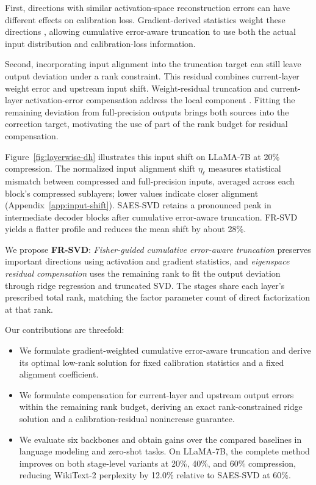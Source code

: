 \documentclass[11pt]{article}
\begin{document}
First, directions with similar activation-space reconstruction errors can have different effects on calibration loss. Gradient-derived statistics weight these directions \citep{hsu2022fwsvd,chekalina2025gfwsvd}, allowing cumulative error-aware truncation to use both the actual input distribution and calibration-loss information.

Second, incorporating input alignment into the truncation target can still leave output deviation under a rank constraint. This residual combines current-layer weight error and upstream input shift. Weight-residual truncation and current-layer activation-error compensation address the local component \citep{bai2025ercsvd,liu2025eora}. Fitting the remaining deviation from full-precision outputs brings both sources into the correction target, motivating the use of part of the rank budget for residual compensation.

Figure~\ref{fig:layerwise-dh} illustrates this input shift on LLaMA-7B at 20\% compression. The normalized input alignment shift $\eta_\ell$ measures statistical mismatch between compressed and full-precision inputs, averaged across each block's compressed sublayers; lower values indicate closer alignment (Appendix~\ref{app:input-shift}). SAES-SVD retains a pronounced peak in intermediate decoder blocks after cumulative error-aware truncation. FR-SVD yields a flatter profile and reduces the mean shift by about 28\%.



We propose \textbf{FR-SVD}: \emph{Fisher-guided cumulative error-aware truncation} preserves important directions using activation and gradient statistics, and \emph{eigenspace residual compensation} uses the remaining rank to fit the output deviation through ridge regression and truncated SVD. The stages share each layer's prescribed total rank, matching the factor parameter count of direct factorization at that rank.

Our contributions are threefold:
\begin{itemize}
\item We formulate gradient-weighted cumulative error-aware truncation and derive its optimal low-rank solution for fixed calibration statistics and a fixed alignment coefficient.
\item We formulate compensation for current-layer and upstream output errors within the remaining rank budget, deriving an exact rank-constrained ridge solution and a calibration-residual nonincrease guarantee.
\item We evaluate six backbones and obtain gains over the compared baselines in language modeling and zero-shot tasks. On LLaMA-7B, the complete method improves on both stage-level variants at 20\%, 40\%, and 60\% compression, reducing WikiText-2 perplexity by 12.0\% relative to SAES-SVD at 60\%.
\end{itemize}
\end{document}
